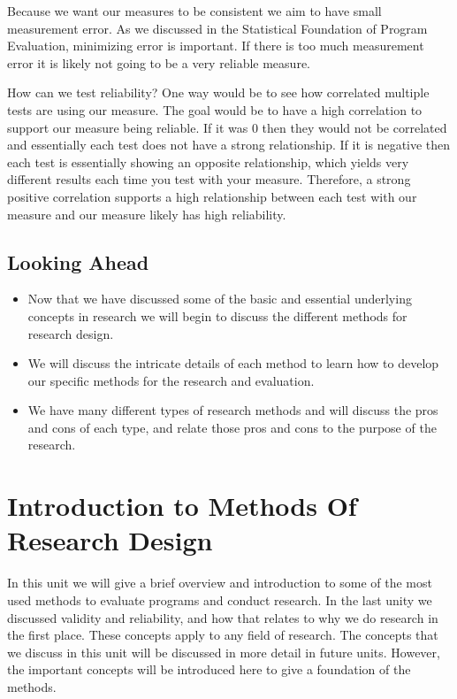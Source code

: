 \documentclass[]{book}
\theoremstyle{definition}
\theoremstyle{definition}
\theoremstyle{definition}
\theoremstyle{remark}
\begin{document}
Because we want our measures to be consistent we aim to have small
measurement error. As we discussed in the Statistical Foundation of
Program Evaluation, minimizing error is important. If there is too much
measurement error it is likely not going to be a very reliable measure.

How can we test reliability? One way would be to see how correlated
multiple tests are using our measure. The goal would be to have a high
correlation to support our measure being reliable. If it was 0 then they
would not be correlated and essentially each test does not have a strong
relationship. If it is negative then each test is essentially showing an
opposite relationship, which yields very different results each time you
test with your measure. Therefore, a strong positive correlation
supports a high relationship between each test with our measure and our
measure likely has high reliability.

\hypertarget{looking-ahead-4}{%
\section{Looking Ahead}\label{looking-ahead-4}}

\begin{itemize}
\item
  Now that we have discussed some of the basic and essential underlying
  concepts in research we will begin to discuss the different methods
  for research design.
\item
  We will discuss the intricate details of each method to learn how to
  develop our specific methods for the research and evaluation.
\item
  We have many different types of research methods and will discuss the
  pros and cons of each type, and relate those pros and cons to the
  purpose of the research.
\end{itemize}

\hypertarget{introduction-to-methods-of-research-design}{%
\chapter{Introduction to Methods Of Research
Design}\label{introduction-to-methods-of-research-design}}

In this unit we will give a brief overview and introduction to some of
the most used methods to evaluate programs and conduct research. In the
last unity we discussed validity and reliability, and how that relates
to why we do research in the first place. These concepts apply to any
field of research. The concepts that we discuss in this unit will be
discussed in more detail in future units. However, the important
concepts will be introduced here to give a foundation of the methods.
\end{document}

